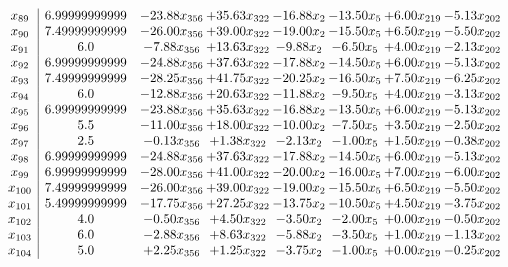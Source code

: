 \documentclass[8pt]{article}
\begin{document}
\[\begin{array}{c| c c@{\hskip 2pt} c@{\hskip 2pt} c@{\hskip 2pt} c@{\hskip 2pt} c@{\hskip 2pt} c@{\hskip 2pt} }
 x_{89}   &  6.99999999999 & -23.88 x_{356} & + 35.63 x_{322} & -16.88 x_{2} & -13.50 x_{5} & +  6.00 x_{219} & -5.13 x_{202}\\
 x_{90}   &  7.49999999999 & -26.00 x_{356} & + 39.00 x_{322} & -19.00 x_{2} & -15.50 x_{5} & +  6.50 x_{219} & -5.50 x_{202}\\
 x_{91}   &  6.0 & -7.88 x_{356} & + 13.63 x_{322} & -9.88 x_{2} & -6.50 x_{5} & +  4.00 x_{219} & -2.13 x_{202}\\
 x_{92}   &  6.99999999999 & -24.88 x_{356} & + 37.63 x_{322} & -17.88 x_{2} & -14.50 x_{5} & +  6.00 x_{219} & -5.13 x_{202}\\
 x_{93}   &  7.49999999999 & -28.25 x_{356} & + 41.75 x_{322} & -20.25 x_{2} & -16.50 x_{5} & +  7.50 x_{219} & -6.25 x_{202}\\
 x_{94}   &  6.0 & -12.88 x_{356} & + 20.63 x_{322} & -11.88 x_{2} & -9.50 x_{5} & +  4.00 x_{219} & -3.13 x_{202}\\
 x_{95}   &  6.99999999999 & -23.88 x_{356} & + 35.63 x_{322} & -16.88 x_{2} & -13.50 x_{5} & +  6.00 x_{219} & -5.13 x_{202}\\
 x_{96}   &  5.5 & -11.00 x_{356} & + 18.00 x_{322} & -10.00 x_{2} & -7.50 x_{5} & +  3.50 x_{219} & -2.50 x_{202}\\
 x_{97}   &  2.5 & -0.13 x_{356} & +  1.38 x_{322} & -2.13 x_{2} & -1.00 x_{5} & +  1.50 x_{219} & -0.38 x_{202}\\
 x_{98}   &  6.99999999999 & -24.88 x_{356} & + 37.63 x_{322} & -17.88 x_{2} & -14.50 x_{5} & +  6.00 x_{219} & -5.13 x_{202}\\
 x_{99}   &  6.99999999999 & -28.00 x_{356} & + 41.00 x_{322} & -20.00 x_{2} & -16.00 x_{5} & +  7.00 x_{219} & -6.00 x_{202}\\
 x_{100}   &  7.49999999999 & -26.00 x_{356} & + 39.00 x_{322} & -19.00 x_{2} & -15.50 x_{5} & +  6.50 x_{219} & -5.50 x_{202}\\
 x_{101}   &  5.49999999999 & -17.75 x_{356} & + 27.25 x_{322} & -13.75 x_{2} & -10.50 x_{5} & +  4.50 x_{219} & -3.75 x_{202}\\
 x_{102}   &  4.0 & -0.50 x_{356} & +  4.50 x_{322} & -3.50 x_{2} & -2.00 x_{5} & +  0.00 x_{219} & -0.50 x_{202}\\
 x_{103}   &  6.0 & -2.88 x_{356} & +  8.63 x_{322} & -5.88 x_{2} & -3.50 x_{5} & +  1.00 x_{219} & -1.13 x_{202}\\
 x_{104}   &  5.0 & +  2.25 x_{356} & +  1.25 x_{322} & -3.75 x_{2} & -1.00 x_{5} & +  0.00 x_{219} & -0.25 x_{202}\\

\end{array}\]
\end{document}
